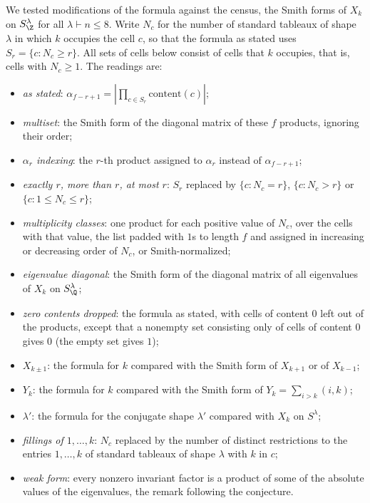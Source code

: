 We tested modifications of the formula against the census, the
Smith forms of $X_k$ on $S^\lambda_\Z$ for all $\lambda\vdash n\le8$. Write
$N_c$ for the number of standard tableaux of shape $\lambda$ in which $k$
occupies the cell $c$, so that the formula as stated uses
$S_r=\{c:N_c\ge r\}$. All sets of cells below consist of cells that $k$
occupies, that is, cells with $N_c\ge1$. The readings are:
\begin{itemize}\itemsep0pt
\item \emph{as stated}: $\alpha_{f-r+1}=|\prod_{c\in S_r}\mathrm{content}(c)|$;
\item \emph{multiset}: the Smith form of the diagonal matrix of these $f$
products, ignoring their order;
\item \emph{$\alpha_r$ indexing}: the $r$-th product assigned to $\alpha_r$
instead of $\alpha_{f-r+1}$;
\item \emph{exactly $r$, more than $r$, at most $r$}: $S_r$ replaced by
$\{c:N_c=r\}$, $\{c:N_c>r\}$ or $\{c:1\le N_c\le r\}$;
\item \emph{multiplicity classes}: one product for each positive value of
$N_c$, over the cells with that value, the list padded with $1$s to length
$f$ and assigned in increasing or decreasing order of $N_c$, or
Smith-normalized;
\item \emph{eigenvalue diagonal}: the Smith form of the diagonal matrix of
all eigenvalues of $X_k$ on $S^\lambda_\Q$;
\item \emph{zero contents dropped}: the formula as stated, with cells of
content $0$ left out of the products, except that a nonempty set consisting
only of cells of content $0$ gives $0$ (the empty set gives $1$);
\item \emph{$X_{k\pm1}$}: the formula for $k$ compared with the Smith form of
$X_{k+1}$ or of $X_{k-1}$;
\item \emph{$Y_k$}: the formula for $k$ compared with the Smith form of
$Y_k=\sum_{i>k}(i,k)$;
\item \emph{$\lambda'$}: the formula for the conjugate shape $\lambda'$
compared with $X_k$ on $S^\lambda$;
\item \emph{fillings of $1,\dots,k$}: $N_c$ replaced by the number of
distinct restrictions to the entries $1,\dots,k$ of standard tableaux of
shape $\lambda$ with $k$ in $c$;
\item \emph{weak form}: every nonzero invariant factor is a product of some
of the absolute values of the eigenvalues, the remark following the
conjecture.
\end{itemize}
